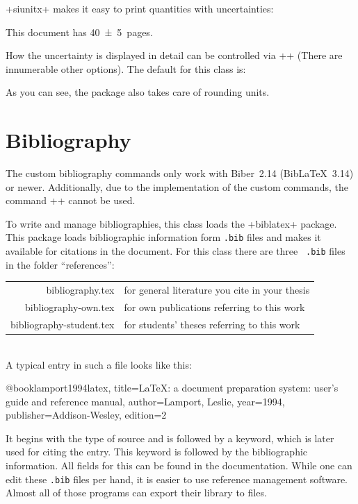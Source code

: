 \documentclass[
  paper = 17x24, %
  language = english, %
  acronym = true, %
  bibliography = true, %
  acronymline = onlyhorizontal, %
]{faupress}
\begin{document}
\newpage
\code+siunitx+ makes it easy to print quantities with uncertainties:
\begin{codeexamplebox}
  This document has \SI{40 +- 5}{pages}.
\end{codeexamplebox}
How the uncertainty is displayed in detail can be controlled via \code+\sisetup+ (There
are innumerable other options). The default for this class is:
\begin{codebox}
\end{codebox}
As you can see, the package also takes care of rounding units.

\chapter{Bibliography}
\label{cha:bibliography}

The custom bibliography commands only work with Biber~2.14 (Bib\LaTeX{}~3.14) or
newer. Additionally, due to the implementation of the custom commands, the command
\code+\nocite{}+ cannot be used.


To write and manage bibliographies, this class loads the
\code+biblatex+ package. This package loads
bibliographic information form \texttt{.bib} files and makes it available for citations in
the document. For this class there are three ~\texttt{.bib} files in the
folder \enquote{references}:\\[0.5\baselineskip]
\begin{tabular}{@{}>{\ttfamily}r@{\;--\;} p{}}
  bibliography.tex & for general literature you cite in your thesis\\
  bibliography-own.tex & for own publications referring to this work\\
  bibliography-student.tex & for students’ theses referring to this work
\end{tabular}\\[0.5\baselineskip]
A typical entry in such a file looks like this:
\begin{codebox}[bib]
  @book{lamport1994latex,
    title={\LaTeX: a document preparation
      system: user's guide and reference manual},
    author={Lamport, Leslie},
    year={1994},
    publisher={Addison-Wesley},
    edition={2}
  }
\end{codebox}
It begins with the type of source and is followed by a keyword, which is later used for
citing the entry. This keyword is followed by the bibliographic information. All fields
for this can be found in the documentation. While one can edit these \texttt{.bib} files
per hand, it is easier to use reference management software. Almost all of those programs
can export their library to  files.
\end{document}
